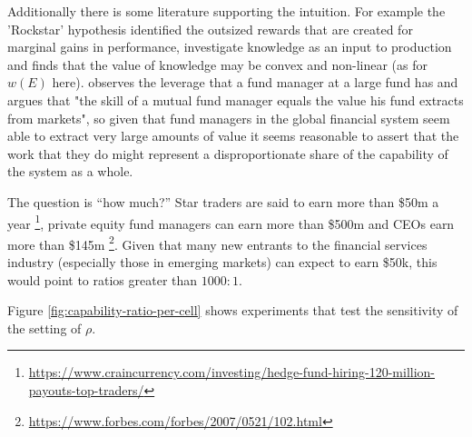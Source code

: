\documentclass[11pt]{article}
\begin{document}
Additionally there is some literature supporting the intuition. For example the 'Rockstar' hypothesis \cite{rosen_economics_1981} identified the outsized rewards that are created for marginal gains in performance, \cite{garicano_organization_2005} investigate knowledge as an input to production and finds that the value of knowledge may be convex and non-linear (as for $w(E)$ here). \cite{berk_measuring_2015} observes the leverage that a fund manager at a large fund has and argues that "the skill of a mutual fund manager equals the value his fund extracts from markets", so given that fund managers in the global financial system seem able to extract very large amounts of value it seems reasonable to assert that the work that they do might represent a disproportionate share of the capability of the system as a whole.

The question is ``how much?'' Star traders are said to earn more than \$50m a year \footnote{\url{https://www.craincurrency.com/investing/hedge-fund-hiring-120-million-payouts-top-traders/}}, private equity fund managers can earn more than \$500m and CEOs earn more than \$145m \footnote{\url{https://www.forbes.com/forbes/2007/0521/102.html}}. Given that many new entrants to the financial services industry (especially those in emerging markets) can expect to earn \$50k, this would point to ratios greater than $1000{:}1$.

Figure  \ref{fig:capability-ratio-per-cell} shows experiments that test the sensitivity of the setting of $\rho$. 
\end{document}
